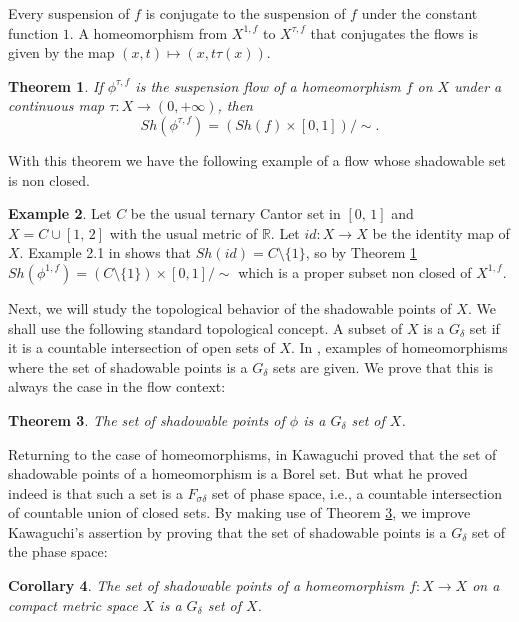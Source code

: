 \documentclass{amsart}
\newtheorem{theorem}{Theorem}[section]
\newtheorem{corollary}[theorem]{Corollary}
\theoremstyle{definition}
\newtheorem{example}[theorem]{Example}
\begin{document}
Every suspension of $f$ is conjugate to the suspension of $f$ under the constant function $1$. A homeomorphism from $X^{1,f}$ to $X^{\tau,f}$ that conjugates the flows is given by the map $(x,t)\mapsto (x,t\tau(x))$.

\begin{theorem}\label{suspe1}
	If $\phi^{\tau,f}$ is the suspension flow of a homeomorphism $f$ on $X$ under a continuous map $\tau:X\rightarrow(0,+\infty)$, then
	$$Sh(\phi^{\tau,f})=(Sh(f)\times [0,1])/\sim.$$
\end{theorem}

With this theorem we have the following example of a flow whose shadowable set is non closed.

\begin{example}\label{examplechivo}
	Let $C$ be the usual ternary Cantor set in $[0,\,1]$ and $X = C \cup [1,\,2]$ with the usual metric of $\mathbb{R}$. Let $id\colon X\to X$ be the identity map of $X$. Example 2.1 in \cite{Morales16} shows that $Sh(id) = C\setminus\{1\}$, so by Theorem \ref{suspe1} $Sh(\phi^{1,f}) = (C\setminus\{1\})\times[0,1]/\sim$ which is a   proper subset non closed of $X^{1,f}$. 
\end{example}

Next, we will study the topological behavior of the shadowable points of $X$. We shall use the following standard topological concept. A subset of $X$ is a $G_\delta$ set if it is a countable intersection of open sets of $X$.
In \cite{Morales16},  examples of homeomorphisms where the set of shadowable points is a $G_\delta$ sets are given. We prove that this is always the case in the flow context:

\begin{theorem}\label{teo2.5}
The set of shadowable points of $\phi$ is a $G_{\delta}$ set of $X$.
\end{theorem}

Returning to the case of homeomorphisms, in \cite{Kawaguchi17}  Kawaguchi proved that the set of shadowable points of a homeomorphism is a  Borel set. But what he proved indeed is that such a set is a $F_{\sigma\delta}$ set of phase space, i.e., a countable intersection of countable union of closed sets. By making use of Theorem \ref{teo2.5}, we improve Kawaguchi's assertion by proving that the set of shadowable points is a $G_{\delta}$ set of the phase space:

\begin{corollary}\label{coroG}
The set of shadowable points of a homeomorphism $f\colon X\to X$ on a compact metric space $X$ is a $G_\delta$ set of $X$.
\end{corollary}
\end{document}
